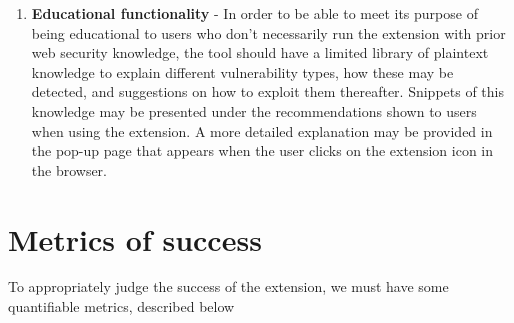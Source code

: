 \begin{enumerate}
	\item \textbf{Educational functionality} - In order to be able to meet its purpose of being educational to users who don't necessarily run the extension with prior web security knowledge, the tool should have a limited library of plaintext knowledge to explain different vulnerability types, how these may be detected, and suggestions on how to exploit them thereafter. Snippets of this knowledge may be presented under the recommendations shown to users when using the extension. A more detailed explanation may be provided in the pop-up page that appears when the user clicks on the extension icon in the browser.
\end{enumerate}


\section{Metrics of success}

To appropriately judge the success of the extension, we must have some quantifiable metrics, described below

